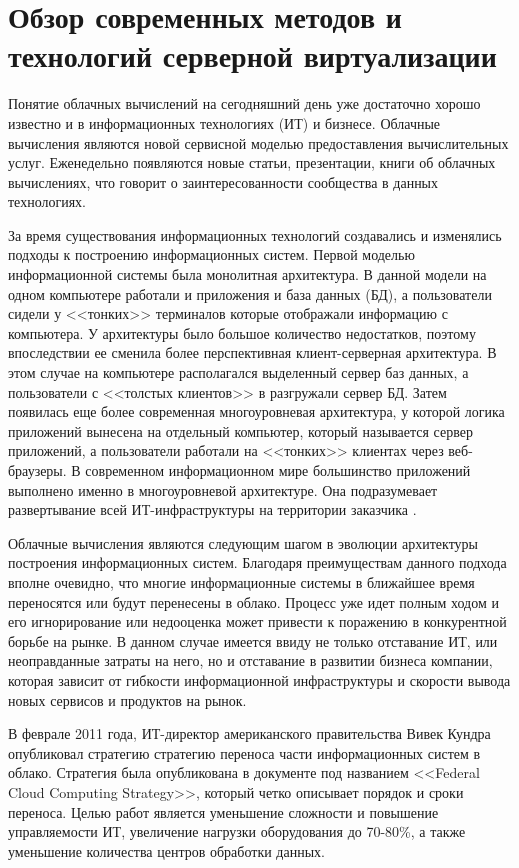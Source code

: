 \section{Обзор современных методов и технологий серверной виртуализации}

Понятие облачных вычислений на сегодняшний день уже достаточно хорошо известно и в информационных технологиях (ИТ) и бизнесе.
Облачные вычисления являются новой сервисной моделью предоставления вычислительных услуг.
Еженедельно появляются новые статьи, презентации, книги об облачных вычислениях, что говорит о заинтересованности сообщества в данных технологиях.

За время существования информационных технологий создавались и изменялись подходы к построению информационных систем.
Первой моделью информационной системы была монолитная архитектура.
В данной модели на одном компьютере работали и приложения и база данных (БД), а пользователи сидели у <<тонких>> терминалов которые отображали информацию с компьютера.
У архитектуры было большое количество недостатков, поэтому впоследствии ее сменила более перспективная клиент-серверная архитектура.
В этом случае на компьютере располагался выделенный сервер баз данных, а пользователи с <<толстых клиентов>> в разгружали сервер БД.
Затем появилась еще более современная многоуровневая архитектура, у которой логика приложений вынесена на отдельный компьютер, который называется сервер приложений, а пользователи работали на <<тонких>> клиентах через веб-браузеры.
В современном информационном мире большинство приложений выполнено именно в многоуровневой архитектуре.
Она подразумевает развертывание всей ИТ-инфраструктуры на территории заказчика \cite{oracle-db}.

Облачные вычисления являются следующим шагом в эволюции архитектуры построения информационных систем.
Благодаря преимуществам данного подхода вполне очевидно, что многие информационные системы в ближайшее время переносятся или будут перенесены в облако.
Процесс уже идет полным ходом и его игнорирование или недооценка может привести к поражению в конкурентной борьбе на рынке.
В данном случае имеется ввиду не только отставание ИТ, или неоправданные затраты на него, но и отставание в развитии бизнеса компании, которая зависит от гибкости информационной инфраструктуры и скорости вывода новых сервисов и продуктов на рынок.

В феврале 2011 года, ИТ-директор американского правительства Вивек Кундра опубликовал стратегию стратегию переноса части информационных систем в облако.
Стратегия была опубликована в документе под названием <<Federal Cloud Computing Strategy>>, который четко описывает порядок и сроки переноса.
Целью работ является уменьшение сложности и повышение управляемости ИТ, увеличение нагрузки оборудования до 70-80\%, а также уменьшение количества центров обработки данных.

